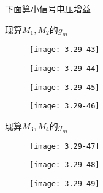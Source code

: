 下面算小信号电压增益

现算$M_1,M_2$的$g_m$

		\begin{figure}[H] %
	\begin{minipage}{\linewidth}
		\texttt{[image: 3.29-43]}
	\end{minipage}
\end{figure}


		\begin{figure}[H] %
	\begin{minipage}{\linewidth}
		\texttt{[image: 3.29-44]}
	\end{minipage}
\end{figure}


		\begin{figure}[H] %
	\begin{minipage}{\linewidth}
		\texttt{[image: 3.29-45]}
	\end{minipage}
\end{figure}


		\begin{figure}[H] %
	\begin{minipage}{\linewidth}
		\texttt{[image: 3.29-46]}
	\end{minipage}
\end{figure}








现算$M_3,M_4$的$g_m$

		\begin{figure}[H] %
	\begin{minipage}{\linewidth}
		\texttt{[image: 3.29-47]}
	\end{minipage}
\end{figure}


		\begin{figure}[H] %
	\begin{minipage}{\linewidth}
		\texttt{[image: 3.29-48]}
	\end{minipage}
\end{figure}


		\begin{figure}[H] %
	\begin{minipage}{\linewidth}
		\texttt{[image: 3.29-49]}
	\end{minipage}
\end{figure}


